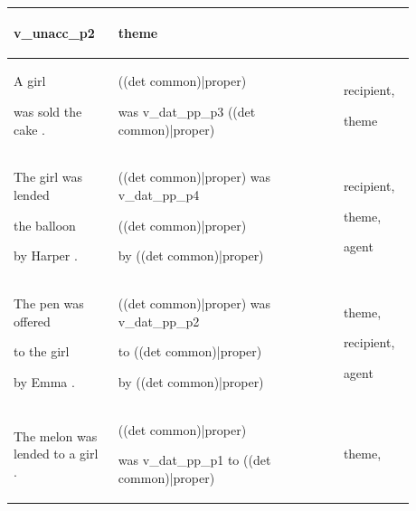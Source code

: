 \documentclass[11pt]{article}
\begin{document}
\begin{table}
\begin{tabular}{p{0.225\linewidth} p{0.50\linewidth} p{0.15\linewidth}}
\begin{tiny}
v\_unacc\_p2\end{tiny} & \begin{tiny}theme\end{tiny} \\
\hline
\begin{tiny}A girl 

was sold the cake .\end{tiny} & \begin{tiny}((det common)|proper)

was v\_dat\_pp\_p3 ((det common)|proper)\end{tiny} & \begin{tiny}recipient,

theme\end{tiny} \\
\hline
\begin{tiny}The girl was lended 

the balloon 

by Harper .\end{tiny} & \begin{tiny}((det common)|proper) was v\_dat\_pp\_p4 

((det common)|proper)

by ((det common)|proper)\end{tiny} & \begin{tiny}recipient,

theme,

agent\end{tiny} \\
\hline
\begin{tiny}The pen was offered

to the girl 

by Emma .\end{tiny} & \begin{tiny}((det common)|proper) was v\_dat\_pp\_p2 

to ((det common)|proper) 

by ((det common)|proper)\end{tiny} & \begin{tiny}theme,

recipient,

agent\end{tiny} \\
\hline
\begin{tiny}The melon was lended to a girl .\end{tiny} & \begin{tiny}((det common)|proper)

was v\_dat\_pp\_p1 to ((det common)|proper)\end{tiny} & \begin{tiny}theme,


\end{tiny}
\end{tabular}
\end{table}
\end{document}

